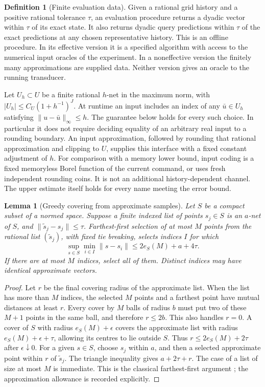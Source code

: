 \documentclass[11pt]{amsart}
\newtheorem{lemma}[theorem]{Lemma}
\theoremstyle{definition}\newtheorem{definition}[theorem]{Definition}
\theoremstyle{remark}\newtheorem{remark}[theorem]{Remark}
\begin{document}
\begin{definition}[Finite evaluation data]\label{def:finite-data}
Given a rational grid history and a positive rational tolerance $\tau$,
an evaluation procedure returns a dyadic vector within $\tau$ of its
exact state. It also returns dyadic query predictions within $\tau$ of
the exact predictions at any chosen representative history. This is an
offline procedure. In its effective version it is a specified algorithm
with access to the numerical input oracles of the experiment. In a
noneffective version the finitely many approximations are supplied data.
Neither version gives an oracle to the running transducer.
\end{definition}

Let $U_h\subset U$ be a finite rational $h$-net in the maximum norm,
with $|U_h|\le C_U(1+h^{-1})^J$. At runtime an input includes an index
of any $\bar u\in U_h$ satisfying $\|u-\bar u\|_\infty\le h$.
The guarantee below holds for every such choice. In particular it does
not require deciding equality of an arbitrary real input to a rounding
boundary. An input approximation, followed by rounding that rational
approximation and clipping to $U$, supplies this interface with a fixed
constant adjustment of $h$. For comparison with a memory lower bound,
input coding is a fixed memoryless Borel function of the current command,
or uses fresh independent rounding coins. It is not an additional
history-dependent channel. The upper estimate itself holds for every
name meeting the error bound.

\begin{lemma}[Greedy covering from approximate samples]\label{lem:finite-greedy}
Let $S$ be a compact subset of a normed space. Suppose a finite indexed
list of points $s_j\in S$ is an $a$-net of $S$, and
$\|\widetilde s_j-s_j\|\le\tau$. Farthest-first selection of at most
$M$ points from the rational list $(\widetilde s_j)$, with fixed tie
breaking, selects indices $I$ for which
\[
 \sup_{s\in S}\min_{i\in I}\|s-s_i\|
                 \le 2e_S(M)+a+4\tau.
\]
If there are at most $M$ indices, select all of them. Distinct indices
may have identical approximate vectors.
\end{lemma}
\begin{proof}
Let $r$ be the final covering radius of the approximate list. When the
list has more than $M$ indices, the selected $M$ points and a farthest
point have mutual distances at least $r$. Every cover by $M$ balls of
radius $b$ must put two of these $M+1$ points in the same ball, and
therefore $r\le2b$. This also handles $r=0$. A cover of $S$ with
radius $e_S(M)+\epsilon$ covers the approximate list with radius
$e_S(M)+\epsilon+\tau$, allowing its centres to lie outside $S$.
Thus $r\le2e_S(M)+2\tau$ after $\epsilon\downarrow0$.
For a given $s\in S$, choose $s_j$ within $a$, and then a selected
approximate point within $r$ of $\widetilde s_j$. The triangle
inequality gives $a+2\tau+r$. The case of a list of size at most $M$
is immediate. This is the classical farthest-first argument
\cite{Gonzalez}; the approximation allowance is recorded explicitly.
\end{proof}
\end{document}
